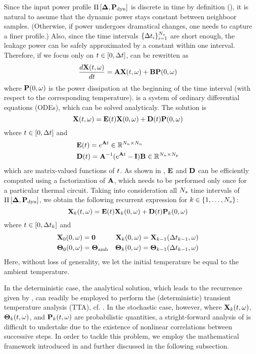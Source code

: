 Since the input power profile $\prof{\mP_\dyn}$ is discrete in time by definition (), it is natural to assume that the dynamic power stays constant between neighboor samples. (Otherwise, if power undergoes dramatical changes, one needs to capture a finer profile.) Also, since the time intervals $\{ \Delta t_i \}_{i = 1}^{{N_s}}$ are short enough, the leakage power can be safely approximated by a constant within one interval. Therefore, if we focus only on $t \in [0, \Delta t]$,  can be rewritten as
\begin{equation} \elabel{fourier-ode}
  \frac{d\vX(\t, \o)}{d\t} = \mA \vX(\t, \o) + \mB \vP(0, \o)
\end{equation}
where $\mathbf{P}(0, \omega)$ is the power dissipation at the beginning of the time interval (with respect to the corresponding temperature).  is a system of ordinary differential equations (ODEs), which can be solved analyticaly. The solution is
\begin{equation} \elabel{ode-solution}
  \vX(\t, \o) = \mE(\t) \vX(0, \o) + \mD(\t) \vP(0, \o)
\end{equation}
where $t \in [0, \Delta t]$ and
\begin{align}
  & \mE(\t) = e^{\mA \t} \in \real^{\nodes \times \nodes} \elabel{e} \\
  & \mD(\t) = \mA^{-1} (e^{\mA \t} - \mI) \mB \in \real^{\nodes \times \cores} \elabel{d}
\end{align}
which are matrix-valued functions of $t$. As shown in \cite{ukhov2012}, $\mE$ and $\mD$ can be efficiently computed using a factorization of $\mA$, which needs to be performed only once for a particular thermal circuit. Taking into consideration all ${N_s}$ time intervals of $\prof{\mP_\dyn}$, we obtain the following recurrent expression for $k \in \{ 1, \dotsc, {N_s} \}$:
\begin{equation} \elabel{recurrence}
  \vX_k(\t, \o) = \mE(\t) \vX_k(0, \o) + \mD(\t) \vP_k(0, \o)
\end{equation}
where $t \in [ 0, \Delta t_k ]$ and
\begin{align*}
  & \mathbf{X}_0(0, \omega) = \mathbf{0} & \mathbf{X}_k(0, \omega) = \mathbf{X}_{k - 1}(\Delta t_{k - 1}, \omega) \\
  & {\boldsymbol\Theta}_0(0, \omega) = {\boldsymbol\Theta}_{\text{amb}} & {\boldsymbol\Theta}_k(0, \omega) = {\boldsymbol\Theta}_{k - 1}(\Delta t_{k - 1}, \omega)
\end{align*}
Here, without loss of generality, we let the initial temperature be equal to the ambient temperature.

In the deterministic case, the analytical solution, which leads to the recurrence given by , can readily be employed to perform the (deterministic) transient temperature analysis (TTA), cf. \cite{ukhov2012}. In the stochastic case, however, where $\mathbf{X}_k(t, \omega)$, ${\boldsymbol\Theta}_k(t, \omega)$, and $\mathbf{P}_k(t, \omega)$ are probabilistic quantities, a stright-forward analysis of  is difficult to undertake due to the existence of nonlinear correlations between successive steps. In order to tackle this problem, we employ the mathematical framework introduced in  and further discussed in the following subsection.
